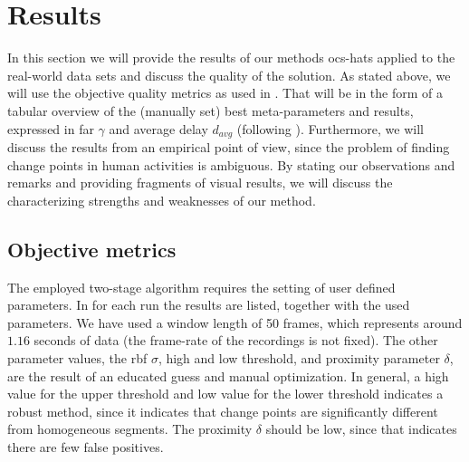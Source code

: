 \section{Results}\label{sec:real_world_results}
In this section we will provide the results of our methods \gls{ocs-hats} applied to the real-world data sets and discuss the quality of the solution.
As stated above, we will use the objective quality metrics as used in .
That will be in the form of a tabular overview of the (manually set) best meta-parameters and results, expressed in \gls{far} $\gamma$ and average delay $d_{avg}$ (following ).
Furthermore, we will discuss the results from an empirical point of view, since the problem of finding change points in human activities is ambiguous.
By stating our observations and remarks and providing fragments of visual results, we will discuss the characterizing strengths and weaknesses of our method.

\subsection{Objective metrics}
The employed two-stage algorithm requires the setting of user defined parameters.
In  for each run the results are listed, together with the used parameters.
We have used a window length of 50 frames, which represents around $1.16$ seconds of data (the frame-rate of the recordings is not fixed).
The other parameter values, \ie the \gls{rbf} $\sigma$, high and low threshold, and proximity parameter $\delta$, are the result of an educated guess and manual optimization.
In general, a high value for the upper threshold and low value for the lower threshold indicates a robust method, since it indicates that change points are significantly different from homogeneous segments.
The proximity $\delta$ should be low, since that indicates there are few false positives.

